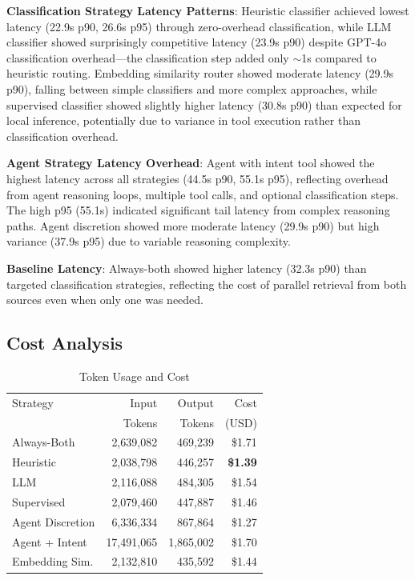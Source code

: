 \documentclass[twocolumn,10pt]{article}
\begin{document}
\textbf{Classification Strategy Latency Patterns}: Heuristic classifier achieved lowest latency (22.9s p90, 26.6s p95) through zero-overhead classification, while LLM classifier showed surprisingly competitive latency (23.9s p90) despite GPT-4o classification overhead---the classification step added only $\sim$1s compared to heuristic routing. Embedding similarity router showed moderate latency (29.9s p90), falling between simple classifiers and more complex approaches, while supervised classifier showed slightly higher latency (30.8s p90) than expected for local inference, potentially due to variance in tool execution rather than classification overhead.

\textbf{Agent Strategy Latency Overhead}: Agent with intent tool showed the highest latency across all strategies (44.5s p90, 55.1s p95), reflecting overhead from agent reasoning loops, multiple tool calls, and optional classification steps. The high p95 (55.1s) indicated significant tail latency from complex reasoning paths. Agent discretion showed more moderate latency (29.9s p90) but high variance (37.9s p95) due to variable reasoning complexity.

\textbf{Baseline Latency}: Always-both showed higher latency (32.3s p90) than targeted classification strategies, reflecting the cost of parallel retrieval from both sources even when only one was needed.

\subsection{Cost Analysis}

\begin{table}[h]
\centering
\caption{Token Usage and Cost}
\footnotesize
\begin{tabular}{lrrr}
\toprule
Strategy & Input & Output & Cost \\
 & Tokens & Tokens & (USD) \\
\midrule
Always-Both & 2,639,082 & 469,239 & \$1.71 \\
Heuristic & 2,038,798 & 446,257 & \textbf{\$1.39} \\
LLM & 2,116,088 & 484,305 & \$1.54 \\
Supervised & 2,079,460 & 447,887 & \$1.46 \\
Agent Discretion & 6,336,334 & 867,864 & \$1.27 \\
Agent + Intent & 17,491,065 & 1,865,002 & \$1.70 \\
Embedding Sim. & 2,132,810 & 435,592 & \$1.44 \\
\bottomrule
\end{tabular}
\end{table}
\end{document}
